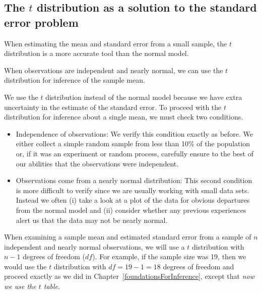 
\subsection{The $t$ distribution as a solution to the standard error problem}
\label{tDistSolutionToSEProblem}

When estimating the mean and standard error from a small sample, the $t$ distribution is a more accurate tool than the normal model.

\begin{tipBox}{
When observations are independent and nearly normal, we can use the $t$ distribution for inference of the sample mean.
}
\end{tipBox}

We use the $t$ distribution instead of the normal model because we have extra uncertainty in the estimate of the standard error. To proceed with the $t$ distribution for inference about a single mean, we must check two conditions.
\begin{itemize}
\item Independence of observations: We verify this condition exactly as before. We either collect a simple random sample from less than 10\% of the population or, if it was an experiment or random process, carefully ensure to the best of our abilities that the observations were independent.
\item Observations come from a nearly normal distribution: This second condition is more difficult to verify since we are usually working with small data sets. Instead we often (i) take a look at a plot of the data for obvious departures from the normal model and (ii) consider whether any previous experiences alert us that the data may not be nearly normal.
\end{itemize}
When examining a sample mean and estimated standard error from a sample of $n$ independent and nearly normal observations, we will use a $t$ distribution with $n-1$ degrees of freedom ($df$). For example, if the sample size was 19, then we would use the $t$ distribution with $df=19-1=18$ degrees of freedom and proceed exactly as we did in Chapter~\ref{foundationsForInference}, except that \emph{now we use the $t$ table}.

